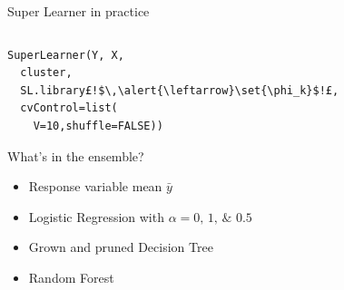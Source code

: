 \begin{frame}[fragile]{Super Learner in practice}



\begin{columns}[T]
\hspace*{-2em}\begin{column}{0.55\textwidth}
\begin{lstlisting}
SuperLearner(Y, X,
  cluster,
  SL.library£!$\,\alert{\leftarrow}\set{\phi_k}$!£,
  cvControl=list(
    V=10,shuffle=FALSE))
\end{lstlisting}

\vspace{0.5em}What's in the ensemble?
\begin{itemize}
	\item Response variable mean $\bar{y}$
	\item Logistic Regression with $\alpha=\numlist{0;1;0.5}$
	\item Grown and pruned Decision Tree
	\item Random Forest
\end{itemize}
\end{column}
\hspace*{-3em}\begin{column}{0.5\textwidth}
\end{column}
\end{columns}
\end{frame}
